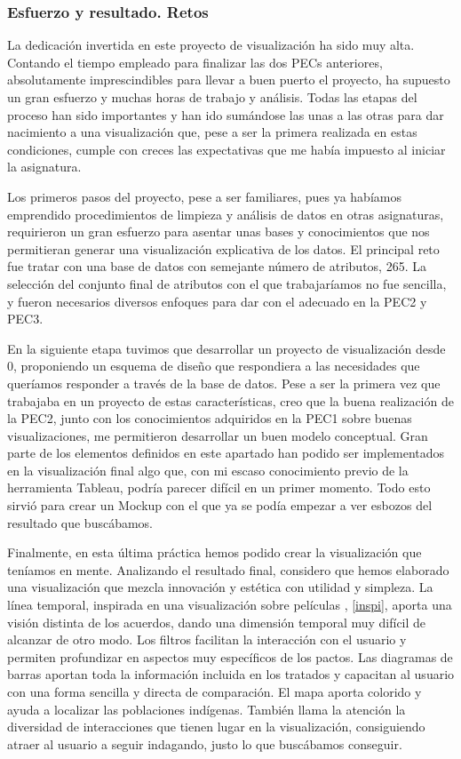 \documentclass[11pt]{article}
\begin{document}
\subsubsection{Esfuerzo y resultado. Retos}

La dedicación invertida en este proyecto de visualización ha sido muy alta. Contando el tiempo empleado para finalizar las dos PECs anteriores, absolutamente imprescindibles para llevar a buen puerto el proyecto, ha supuesto un gran esfuerzo y muchas horas de trabajo y análisis. Todas las etapas del proceso han sido importantes y han ido sumándose las unas a las otras para dar nacimiento a una visualización que, pese a ser la primera realizada en estas condiciones, cumple con creces las expectativas que me había impuesto al iniciar la asignatura. 

Los primeros pasos del proyecto, pese a ser familiares, pues ya habíamos emprendido procedimientos de limpieza y análisis de datos en otras asignaturas, requirieron un gran esfuerzo para asentar unas bases y conocimientos que nos permitieran generar una visualización explicativa de los datos. El principal reto fue tratar con una base de datos con semejante número de atributos, 265. La selección del conjunto final de atributos con el que trabajaríamos no fue sencilla, y fueron necesarios diversos enfoques para dar con el adecuado en la PEC2 y PEC3.

En la siguiente etapa tuvimos que desarrollar un proyecto de visualización desde 0, proponiendo un esquema de diseño que respondiera a las necesidades que queríamos responder a través de la base de datos. Pese a ser la primera vez que trabajaba en un proyecto de estas características, creo que la buena realización de la PEC2, junto con los conocimientos adquiridos en la PEC1 sobre buenas visualizaciones, me permitieron desarrollar un buen modelo conceptual. Gran parte de los elementos definidos en este apartado han podido ser implementados en la visualización final algo que, con mi escaso conocimiento previo de la herramienta Tableau, podría parecer difícil en un primer momento. Todo esto sirvió para crear un Mockup con el que ya se podía empezar a ver esbozos del resultado que buscábamos.

Finalmente, en esta última práctica hemos podido crear la visualización que teníamos en mente. Analizando el resultado final, considero que hemos elaborado una visualización que mezcla innovación y estética con utilidad y simpleza. La línea temporal, inspirada en una visualización sobre películas \cite{true}, \ref{inspi}, aporta una visión distinta de los acuerdos, dando una dimensión temporal muy difícil de alcanzar de otro modo. Los filtros facilitan la interacción con el usuario y permiten profundizar en aspectos muy específicos de los pactos. Las diagramas de barras aportan toda la información incluida en los tratados y capacitan al usuario con una forma sencilla y directa de comparación. El mapa aporta colorido y ayuda a localizar las poblaciones indígenas. También llama la atención la diversidad de interacciones que tienen lugar en la visualización, consiguiendo atraer al usuario a seguir indagando, justo lo que buscábamos conseguir. 
\end{document}
